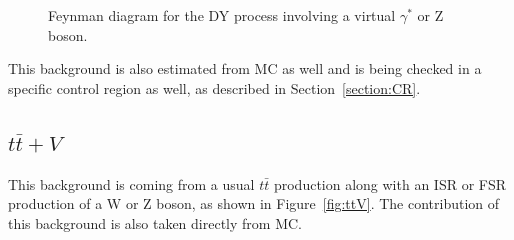\documentclass[a4paper, 10pt, openright]{report}
\begin{document}
\begin{figure}[htbp]
\centering
\begin{minipage}[b]{.34\textwidth}
\end{minipage} 
\caption{Feynman diagram for the \ac{DY} process involving a virtual $\gamma^*$ or Z boson.}
\label{fig:DY}
\end{figure}

This background is also estimated from \ac{MC} as well and is being checked in a specific control region as well, as described in Section~\ref{section:CR}.

\subsection{$t \bar t + V$} \label{subsection:ttV}

This background is coming from a usual $t \bar t$ production along with an \ac{ISR} or \ac{FSR} production of a W or Z boson, as shown in Figure~\ref{fig:ttV}. The contribution of this background is also taken directly from \ac{MC}.
\end{document}
